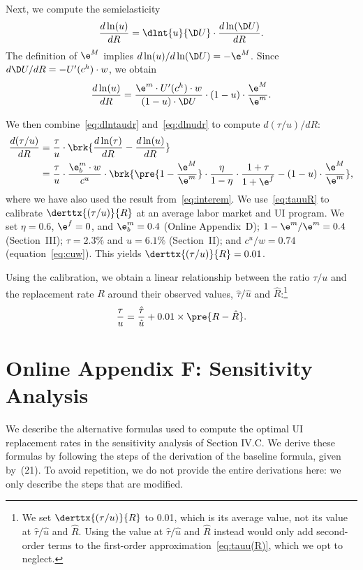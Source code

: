 \documentclass[letterpaper,12pt,leqno]{article}
\begin{document}
Next, we compute the semielasticity 
\begin{equation}
\frac{d\ln(u)}{dR} =\dlnt{u}{\D U}\cdot \frac{d\ln(\D U)}{dR}.
\label{eq:dlnudr}\end{equation}
The definition of $\e^M$  implies $d\ln(u)/d\ln(\D U)=- \e^M$. Since $d\D U/dR=-U'(c^{h})\cdot w$, we obtain
\begin{equation*}
\frac{d\ln(u)}{dR} = \frac{\e^m \cdot U'(c^{h})\cdot w}{(1-u)\cdot \D U}\cdot (1-u)\cdot\frac{\e^M}{\e^m}.
\end{equation*}

We then combine~\eqref{eq:dlntaudr} and~\eqref{eq:dlnudr} to compute $d(\tau/u)/dR$:
\begin{align}
\frac{d(\tau/u)}{dR} & =\frac{\tau}{u}\cdot \brk{\frac{d\ln(\tau)}{dR}-\frac{d\ln(u)}{dR}} \nonumber\\
&= \frac{\tau}{u}\cdot\frac{\e^m_b \cdot w}{c^u}\cdot \brk{\pre{1-\frac{\e^M}{\e^m}} \cdot \frac{\eta}{1-\eta}\cdot \frac{1+\tau}{1+\e^f}-(1-u)\cdot\frac{\e^M}{\e^m}},\label{eq:tauuR}
\end{align}
where we have also used the result from~\eqref{eq:interem}. We use~\eqref{eq:tauuR} to calibrate $\derttx{(\tau/u)}{R}$ at an average labor market and UI program. We set $\eta=0.6$, $\e^f=0$, and $\e^{m}_{b}=0.4$ (Online Appendix~D); $1-\e^m/\e^m=0.4$ (Section~III); $\tau=2.3\%$ and $u=6.1\%$ (Section~II); and $c^u/w=0.74$ (equation~\eqref{eq:cuw}). This yields $\derttx{(\tau/u)}{R}=0.01$.

Using the calibration, we obtain a linear relationship between the ratio $\tau/u$ and the replacement rate $R$ around their observed values, $\hat{\tau}/\hat{u}$ and $\hat{R}$:\footnote{We set $\derttx{(\tau/u)}{R}$ to 0.01, which is its average value, not its value at $\hat{\tau}/\hat{u}$ and $\hat{R}$. Using the value at $\hat{\tau}/\hat{u}$ and $\hat{R}$ instead would only add second-order terms to the first-order approximation~\eqref{eq:tauu(R)}, which we opt to neglect.}
\begin{equation}
\frac{\tau}{u}=\frac{\hat{\tau}}{\hat{u}} + 0.01 \times \pre{R-\hat{R}}.
\label{eq:tauu(R)}\end{equation}

\section{Online Appendix F: Sensitivity Analysis}\label{app:sensitivity}

We describe the alternative formulas used to compute the optimal UI replacement rates in the sensitivity analysis of Section IV.C. We derive these formulas by following the steps of the derivation of the baseline formula, given by~(21). To avoid repetition, we do not provide the entire derivations here: we only describe the steps that are modified.
\end{document}
